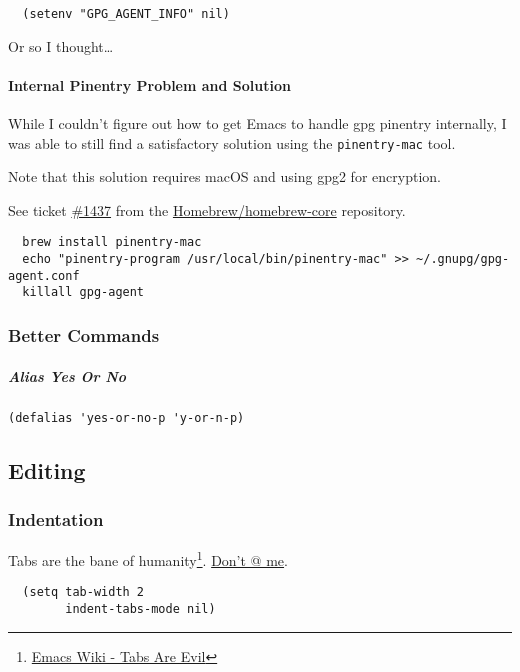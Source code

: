 \documentclass[11pt]{article}
\begin{document}
\begin{verbatim}
  (setenv "GPG_AGENT_INFO" nil)
\end{verbatim}

Or so I thought\ldots{}

\paragraph*{Internal Pinentry Problem and Solution}
\label{sec:orgd466e01}

While I couldn't figure out how to get Emacs to handle gpg pinentry
internally, I was able to still find a satisfactory solution using the
\texttt{pinentry-mac} tool.

Note that this solution requires macOS and using gpg2 for encryption.

See ticket \href{https://github.com/Homebrew/homebrew-core/issues/14737}{\#1437} from the \href{https://github.com/Homebrew/homebrew-core}{Homebrew/homebrew-core} repository.

\begin{verbatim}
  brew install pinentry-mac
  echo "pinentry-program /usr/local/bin/pinentry-mac" >> ~/.gnupg/gpg-agent.conf
  killall gpg-agent
\end{verbatim}

\subsubsection*{Better Commands}
\label{sec:org1c5d93c}
\subparagraph*{Alias Yes Or No}
\label{sec:org6ab9924}

\begin{verbatim}
(defalias 'yes-or-no-p 'y-or-n-p)
\end{verbatim}

\subsection*{Editing}
\label{sec:org6f2903d}
\subsubsection*{Indentation}
\label{sec:org87e3926}

Tabs are the bane of humanity\footnote{\href{https://www.emacswiki.org/emacs/TabsAreEvil}{Emacs Wiki - Tabs Are Evil}}. \href{http://www.urbandictionary.com/define.php?term=dont\%20\%40\%20me}{Don't @ me}.

\begin{verbatim}
  (setq tab-width 2
        indent-tabs-mode nil)
\end{verbatim}
\end{document}
